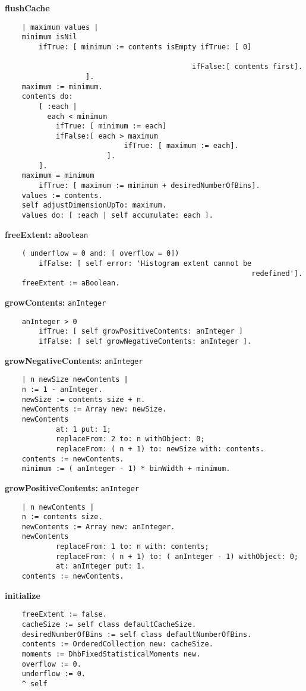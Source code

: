 {\bf flushCache}
\begin{verbatim}
    | maximum values |
    minimum isNil
        ifTrue: [ minimum := contents isEmpty ifTrue: [ 0]
                                                                      
                                            ifFalse:[ contents first].
                   ].
    maximum := minimum.
    contents do:
        [ :each |
          each < minimum
            ifTrue: [ minimum := each]
            ifFalse:[ each > maximum
                            ifTrue: [ maximum := each].
                        ].
        ].
    maximum = minimum
        ifTrue: [ maximum := minimum + desiredNumberOfBins].
    values := contents.
    self adjustDimensionUpTo: maximum.
    values do: [ :each | self accumulate: each ].
\end{verbatim}
{\bf freeExtent:} {\tt aBoolean}
\begin{verbatim}
    ( underflow = 0 and: [ overflow = 0])
        ifFalse: [ self error: 'Histogram extent cannot be 
                                                          redefined'].
    freeExtent := aBoolean.
\end{verbatim}
{\bf growContents:} {\tt anInteger}
\begin{verbatim}
    anInteger > 0
        ifTrue: [ self growPositiveContents: anInteger ]
        ifFalse: [ self growNegativeContents: anInteger ].
\end{verbatim}
{\bf growNegativeContents:} {\tt anInteger}
\begin{verbatim}
    | n newSize newContents |
    n := 1 - anInteger.
    newSize := contents size + n.
    newContents := Array new: newSize.
    newContents
            at: 1 put: 1;
            replaceFrom: 2 to: n withObject: 0;
            replaceFrom: ( n + 1) to: newSize with: contents.
    contents := newContents.
    minimum := ( anInteger - 1) * binWidth + minimum.
\end{verbatim}
{\bf growPositiveContents:} {\tt anInteger}
\begin{verbatim}
    | n newContents |
    n := contents size.
    newContents := Array new: anInteger.
    newContents
            replaceFrom: 1 to: n with: contents;
            replaceFrom: ( n + 1) to: ( anInteger - 1) withObject: 0;
            at: anInteger put: 1.
    contents := newContents.
\end{verbatim}
{\bf initialize}
\begin{verbatim}
    freeExtent := false.
    cacheSize := self class defaultCacheSize.
    desiredNumberOfBins := self class defaultNumberOfBins.
    contents := OrderedCollection new: cacheSize.
    moments := DhbFixedStatisticalMoments new.
    overflow := 0.
    underflow := 0.
    ^ self
\end{verbatim}

